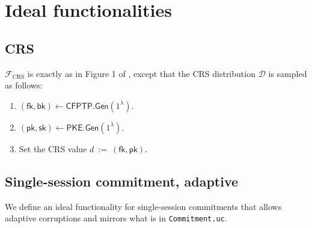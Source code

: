 \documentclass[11pt,letterpaper]{article}
\newcommand{\doclearpage}{%
  \iffull\clearpage\else\fi
}
\theoremstyle{plain} %
\theoremstyle{definition} %
\theoremstyle{remark} %
\newcommand{\eqdef}{\ {:=} \ }
\newcommand{\SecParam}{\lambda}
\newcommand{\PKE}{\mathsf{PKE}}
\newcommand{\Gen}{\mathsf{Gen}}
\newcommand{\EncKey}{\mathsf{pk}}
\newcommand{\DecKey}{\mathsf{sk}}
\newcommand{\CFPTP}{\mathsf{CFPTP}}
\newcommand{\ForwKey}{\mathsf{fk}}
\newcommand{\BackKey}{\mathsf{bk}}
\newcommand{\IF}{\mathcal{F}} %
\newcommand{\IFCrs}{\IF_{\mathrm{CRS}}}
\newcommand{\CrsDistr}{\mathcal{D}}
\newcommand{\File}[1]{\texttt{#1}}
\begin{document}
\doclearpage
\section{Ideal functionalities}
\label{sec:ideal-functionalities}

\subsection{CRS}
\label{sec:ideal-func-crs}
$\IFCrs$ is exactly as in Figure 1 of \cite{CanettiF01}, except that the CRS distribution $\CrsDistr$ is sampled as follows:
\begin{enumerate}[nolistsep]
	\item $(\ForwKey,\BackKey) \gets \CFPTP.\Gen(1^{\SecParam})$.
	\item $(\EncKey,\DecKey) \gets \PKE.\Gen(1^{\SecParam})$.
	\item Set the CRS value $d \eqdef (\ForwKey, \EncKey)$.
\end{enumerate}

\subsection{Single-session commitment, adaptive}
\label{sec:ideal-func-com}

We define an ideal functionality for single-session commitments that allows adaptive corruptions and mirrors what is in \File{Commitment.uc}.
\newcommand{\EnvCommitReqMsg}{\mathsf{EnvCommitReq}}
\newcommand{\IFCommitReqMsg}{\mathsf{IFCommitReq}}
\newcommand{\SimCommitterCorruptionStatusMsg}{\mathsf{CommitterCorruptionStatus}}
\newcommand{\CommitterBitMsg}{\mathsf{CommitterBit}}
\newcommand{\CommitterCorruptedBit}{\mathsf{corrupted}}
\newcommand{\CommitOkMsg}{\mathsf{CommitOk}}
\end{document}
